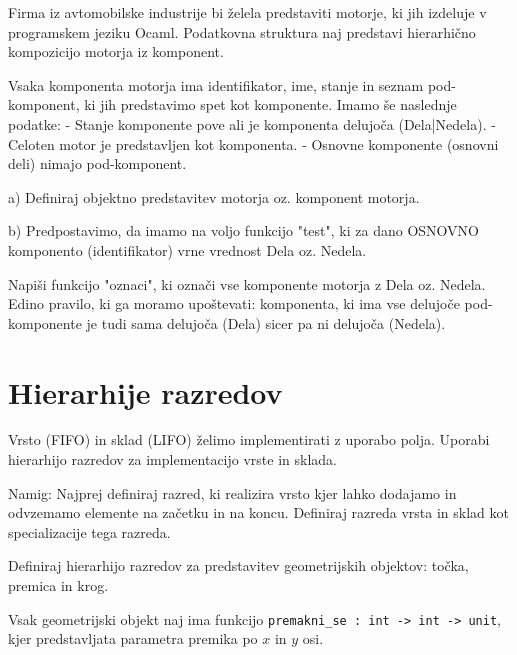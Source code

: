 \begin{ex}
Firma iz avtomobilske industrije bi \v zelela predstaviti motorje, ki jih izdeluje v programskem jeziku Ocaml. Podatkovna struktura naj predstavi hierarhi\v cno kompozicijo motorja iz komponent. 

Vsaka komponenta motorja ima identifikator, ime, stanje in seznam pod-komponent, ki jih predstavimo spet kot komponente. Imamo \v se naslednje podatke:
- Stanje komponente pove ali je komponenta delujo\v ca (Dela|Nedela). 
- Celoten motor je predstavljen kot komponenta. 
- Osnovne komponente (osnovni deli) nimajo pod-komponent.

a) Definiraj objektno predstavitev motorja oz. komponent motorja.

b) Predpostavimo, da imamo na voljo funkcijo "test", ki za dano OSNOVNO komponento (identifikator) vrne  vrednost Dela oz. Nedela. 

Napi\v si funkcijo "oznaci", ki ozna\v ci vse komponente motorja z Dela oz. Nedela. Edino pravilo, ki ga moramo upo\v stevati: komponenta, ki ima vse delujo\v ce pod-komponente je tudi sama delujo\v ca (Dela) sicer pa ni delujo\v ca (Nedela). 





\section{Hierarhije razredov}


\end{ex}
\begin{ex}
Vrsto (FIFO) in sklad (LIFO) \v zelimo implementirati z uporabo polja. Uporabi hierarhijo razredov za implementacijo vrste in sklada. 

Namig: Najprej definiraj razred, ki realizira vrsto kjer lahko dodajamo in odvzemamo elemente na za\v cetku in na koncu. Definiraj razreda vrsta in sklad kot specializacije tega razreda.



\end{ex}
\begin{ex}
Definiraj hierarhijo razredov za predstavitev geometrijskih objektov: to\v cka, premica in krog. 

Vsak geometrijski objekt naj ima funkcijo
\lstinline{premakni_se : int -> int -> unit}, 
kjer predstavljata parametra premika po $x$ in $y$ osi. 

\end{ex}

